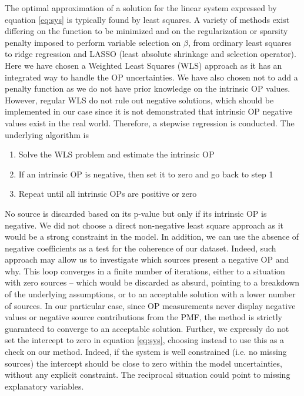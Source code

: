 \documentclass[acp, manuscript]{copernicus}
\begin{document}
The optimal approximation of a solution for the linear system expressed
by equation \ref{eq:sys} is typically found by least squares. A variety of
methods exist differing on the function to be minimized and on the
regularization or sparsity penalty imposed to perform variable selection
on $\beta$, from ordinary least squares to ridge regression and LASSO (least
absolute shrinkage and selection operator). Here we have chosen a
Weighted Least Squares (WLS) approach as it has an integrated way to
handle the OP uncertainties. We have also chosen not to add a penalty
function as we do not have prior knowledge on the intrinsic OP values.
However, regular WLS do not rule out negative solutions, which should be
implemented in our case since it is not demonstrated that intrinsic OP
negative values exist in the real world. Therefore, a stepwise
regression is conducted. The underlying algorithm is

\begin{enumerate}
    \item
        Solve the WLS problem and estimate the intrinsic OP
    \item
        If an intrinsic OP is negative, then set it to zero and go back to step 1
    \item
        Repeat until all intrinsic OPs are positive or zero
\end{enumerate}

No source is discarded based on its p-value but only if its intrinsic OP
is negative. We did not choose a direct non-negative least square
approach as it would be a strong constraint in the model. In addition,
we can use the absence of negative coefficients as a test for the
coherence of our dataset. Indeed, such approach may allow us to
investigate which sources present a negative OP and why. This loop
converges in a finite number of iterations, either to a situation with
zero sources -- which would be discarded as absurd, pointing to a
breakdown of the underlying assumptions, or to an acceptable solution
with a lower number of sources. In our particular case, since OP
measurements never display negative values or negative source
contributions from the PMF, the method is strictly guaranteed to
converge to an acceptable solution. Further, we expressly do not set the
intercept to zero in equation \ref{eq:sys}, choosing instead to use this as a
check on our method. Indeed, if the system is well constrained (i.e. no
missing sources) the intercept should be close to zero within the model
uncertainties, without any explicit constraint. The reciprocal situation
could point to missing explanatory variables.
\end{document}
